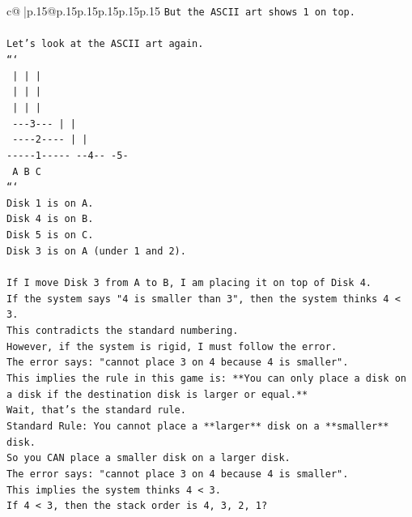\documentclass{article}
\begin{document}
{\begin{supertabular}{c@{$\;$}|p{.15\linewidth}@{}p{.15\linewidth}p{.15\linewidth}p{.15\linewidth}p{.15\linewidth}p{.15\linewidth}}
{{{\texttt{But the ASCII art shows 1 on top.} \\
\\ 
\texttt{Let's look at the ASCII art again.} \\
\texttt{```} \\
\texttt{     |           |           |     } \\
\texttt{     |           |           |     } \\
\texttt{     |           |           |     } \\
\texttt{  {-}{-}{-}3{-}{-}{-}        |           |     } \\
\texttt{ {-}{-}{-}{-}2{-}{-}{-}{-}       |           |     } \\
\texttt{{-}{-}{-}{-}{-}1{-}{-}{-}{-}{-}    {-}{-}4{-}{-}        {-}5{-}    } \\
\texttt{     A           B           C     } \\
\texttt{```} \\
\texttt{Disk 1 is on A.} \\
\texttt{Disk 4 is on B.} \\
\texttt{Disk 5 is on C.} \\
\texttt{Disk 3 is on A (under 1 and 2).} \\
\\ 
\texttt{If I move Disk 3 from A to B, I am placing it on top of Disk 4.} \\
\texttt{If the system says "4 is smaller than 3", then the system thinks 4 < 3.} \\
\texttt{This contradicts the standard numbering.} \\
\texttt{However, if the system is rigid, I must follow the error.} \\
\texttt{The error says: "cannot place 3 on 4 because 4 is smaller".} \\
\texttt{This implies the rule in this game is: **You can only place a disk on a disk if the destination disk is larger or equal.**} \\
\texttt{Wait, that's the standard rule.} \\
\texttt{Standard Rule: You cannot place a **larger** disk on a **smaller** disk.} \\
\texttt{So you CAN place a smaller disk on a larger disk.} \\
\texttt{The error says: "cannot place 3 on 4 because 4 is smaller".} \\
\texttt{This implies the system thinks 4 < 3.} \\
\texttt{If 4 < 3, then the stack order is 4, 3, 2, 1?} \\
}}}
\end{supertabular}}
\end{document}
